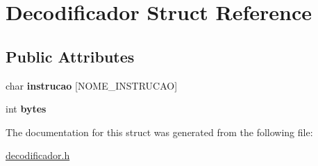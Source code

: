 \hypertarget{structDecodificador}{}\section{Decodificador Struct Reference}
\label{structDecodificador}
\subsection*{Public Attributes}
\begin{DoxyCompactItemize}
\item 
\mbox{\label{structDecodificador_abd91e4ab4dc0ec38489f2c487132ccff}} 
char {\bfseries instrucao} \mbox{[}N\+O\+M\+E\+\_\+\+I\+N\+S\+T\+R\+U\+C\+AO\mbox{]}
\item 
\mbox{\label{structDecodificador_a7081a89f9d4428ef33fb56f647363f72}} 
int {\bfseries bytes}
\end{DoxyCompactItemize}


The documentation for this struct was generated from the following file\+:\begin{DoxyCompactItemize}
\item 
\mbox{\hyperlink{decodificador_8h}{decodificador.\+h}}\end{DoxyCompactItemize}
